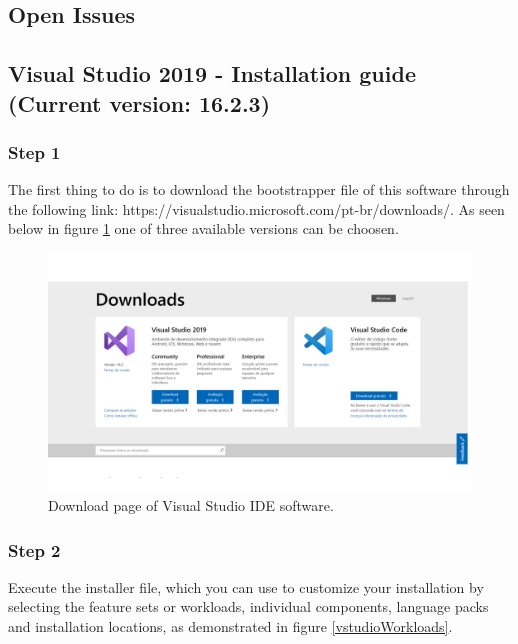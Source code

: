\begin{refsection}
\subsection{Open Issues}

\clearpage
\subsection{Visual Studio 2019 - Installation guide (Current version: 16.2.3)}

\subsubsection{Step 1}

The first thing to do is to download the bootstrapper file of this software through the following link: https://visualstudio.microsoft.com/pt-br/downloads/. As seen below in figure \ref{vstudio} one of three available versions can be choosen.

\begin{figure}[H]
	\centering
	\includegraphics[width=1\linewidth]{./sdf/arduino_quantum_rx/figures/vsDownload.pdf}
	\caption{Download page of Visual Studio IDE software.}
	\label{vstudio}
\end{figure}


\subsubsection{Step 2}

Execute the installer file, which you can use to customize your installation by selecting the feature sets or workloads, individual components, language packs and installation locations, as demonstrated in figure \ref{vstudioWorkloads}. 




\end{refsection}
